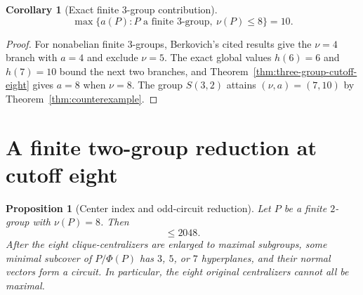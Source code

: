 \documentclass[11pt]{article}
\newtheorem{proposition}[theorem]{Proposition}
\newtheorem{corollary}[theorem]{Corollary}
\theoremstyle{remark}
\newcommand{\nuG}{\nu}
\newcommand{\aG}{a}
\newcommand{\Z}{\mathrm Z}
\begin{document}
\begin{corollary}[Exact finite $3$-group contribution]
\label{cor:three-group-cutoff-eight}
\[
 \max\{\aG(P):P\text{ a finite $3$-group},\ \nuG(P)\le8\}=10.
\]
\end{corollary}

\begin{proof}
For nonabelian finite $3$-groups, Berkovich's cited results give the
$\nuG=4$ branch with $\aG=4$ and exclude $\nuG=5$.  The exact global values
$h(6)=6$ and $h(7)=10$ bound the next two branches, and
Theorem~\ref{thm:three-group-cutoff-eight} gives $\aG=8$ when
$\nuG=8$.  The group $S(3,2)$ attains $(\nuG,\aG)=(7,10)$ by
Theorem~\ref{thm:counterexample}.
\end{proof}

\section{A finite two-group reduction at cutoff eight}

\begin{proposition}[Center index and odd-circuit reduction]
\label{prop:two-group-cutoff-eight}
Let $P$ be a finite $2$-group with $\nuG(P)=8$.  Then
\begin{equation}
 [P:\Z(P)]\le2048.
\label{eq:two-center-index}
\end{equation}
After the eight clique-centralizers are enlarged to maximal subgroups, some
minimal subcover of $P/\Phi(P)$ has $3$, $5$, or $7$ hyperplanes, and their
normal vectors form a circuit.  In particular, the eight original
centralizers cannot all be maximal.
\end{proposition}
\end{document}
